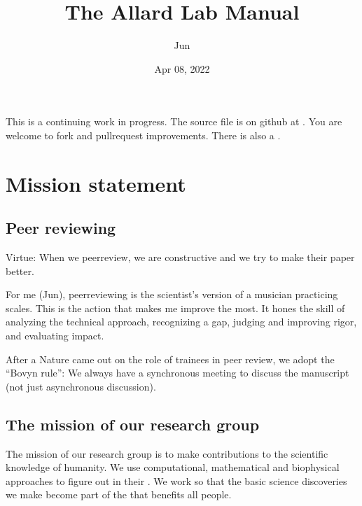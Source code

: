 \documentclass[letterpaper,10pt,english]{sphinxmanual}
\title{The Allard Lab Manual}
\date{Apr 08, 2022}
\author{Jun}
\begin{document}
\pagestyle{empty}
\sphinxmaketitle
\pagestyle{plain}
\sphinxtableofcontents
\pagestyle{normal}
\label{\detokenize{index::doc}}


\sphinxAtStartPar
This is a continuing work in progress.
The source file is on github at .
You are welcome to fork and pull\sphinxhyphen{}request improvements.
There is also a .


\chapter{Mission statement}
\label{\detokenize{01OurMission:mission-statement}}\label{\detokenize{01OurMission::doc}}

\section{Peer reviewing}
\label{\detokenize{PeerReviewing:peer-reviewing}}\label{\detokenize{PeerReviewing:id1}}\label{\detokenize{PeerReviewing::doc}}
\sphinxAtStartPar
Virtue: When we peer\sphinxhyphen{}review, we are constructive and we try to make their paper better.

\sphinxAtStartPar
For me (Jun), peer\sphinxhyphen{}reviewing is the scientist’s version of a musician practicing scales. This is the action that makes me improve the most. It hones the skill of analyzing the technical approach, recognizing a gap, judging and improving rigor, and evaluating impact.

\sphinxAtStartPar
After a Nature  came out on the role of trainees in peer review, we adopt the “Bovyn rule”: We always have a synchronous meeting to discuss the manuscript (not just asynchronous discussion).


\section{The mission of our research group}
\label{\detokenize{01OurMission:the-mission-of-our-research-group}}
\sphinxAtStartPar
The mission of our research group is to make  contributions to the scientific knowledge of humanity.
We use computational, mathematical and biophysical approaches to figure out  in their .
We work so that the basic science discoveries we make become part of the  that benefits all people.
\end{document}
